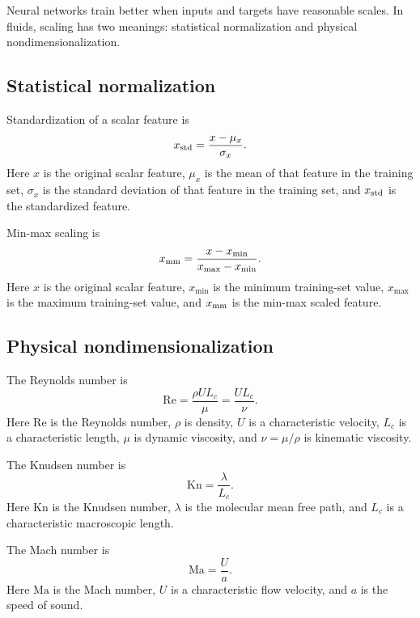 \documentclass[11pt]{article}
\newcommand{\kn}{\mathrm{Kn}}
\newcommand{\re}{\mathrm{Re}}
\newcommand{\ma}{\mathrm{Ma}}
\begin{document}
Neural networks train better when inputs and targets have reasonable scales.  In fluids, scaling has two meanings: statistical normalization and physical nondimensionalization.

\subsection{Statistical normalization}

Standardization of a scalar feature is
\begin{equation}
    x_{\rm std}=\frac{x-\mu_x}{\sigma_x}.
    \label{eq:standardization}
\end{equation}
Here $x$ is the original scalar feature, $\mu_x$ is the mean of that feature in the training set, $\sigma_x$ is the standard deviation of that feature in the training set, and $x_{\rm std}$ is the standardized feature.

Min-max scaling is
\begin{equation}
    x_{\rm mm}=\frac{x-x_{\min}}{x_{\max}-x_{\min}}.
    \label{eq:minmax}
\end{equation}
Here $x$ is the original scalar feature, $x_{\min}$ is the minimum training-set value, $x_{\max}$ is the maximum training-set value, and $x_{\rm mm}$ is the min-max scaled feature.

\subsection{Physical nondimensionalization}

The Reynolds number is
\begin{equation}
    \re=\frac{\rho U L_c}{\mu}=\frac{U L_c}{\nu}.
    \label{eq:reynolds}
\end{equation}
Here $\re$ is the Reynolds number, $\rho$ is density, $U$ is a characteristic velocity, $L_c$ is a characteristic length, $\mu$ is dynamic viscosity, and $\nu=\mu/\rho$ is kinematic viscosity.

The Knudsen number is
\begin{equation}
    \kn=\frac{\lambda}{L_c}.
    \label{eq:knudsen}
\end{equation}
Here $\kn$ is the Knudsen number, $\lambda$ is the molecular mean free path, and $L_c$ is a characteristic macroscopic length.

The Mach number is
\begin{equation}
    \ma=\frac{U}{a}.
    \label{eq:mach}
\end{equation}
Here $\ma$ is the Mach number, $U$ is a characteristic flow velocity, and $a$ is the speed of sound.
\end{document}

